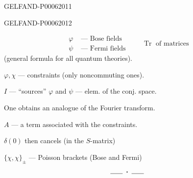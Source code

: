 \begin{GelfandAdjacentEvidence}{GELFAND-P000620}{11}

\end{GelfandAdjacentEvidence}
\begin{GelfandAdjacentEvidence}{GELFAND-P000620}{12}

\end{GelfandAdjacentEvidence}

\[
\begin{aligned}
\varphi&\text{ — Bose fields}\\
\psi&\text{ — Fermi fields}
\end{aligned}
\qquad \operatorname{Tr}\text{ of matrices}
\]
(general formula for all quantum theories).

\(\varphi,\chi\) — constraints (only noncommuting ones).

\(I\) — “sources” \(\varphi\) and \(\psi\) — elem. of the conj. space.

One obtains an analogue of the Fourier transform.

\(A\) — a term associated with the constraints.

\(\delta(0)\) then cancels (in the \(S\)-matrix)

\(\{\chi,\chi\}_{\pm}\) — Poisson brackets (Bose and Fermi)
\[\rule{1.8em}{.4pt}\;\boldsymbol{\cdot}\;\rule{1.8em}{.4pt}\]


